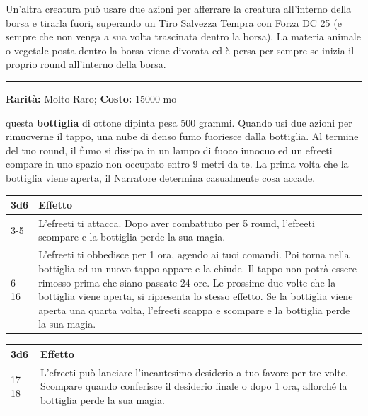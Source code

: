 \begin{multicols}{2}
Un'altra creatura può usare due azioni per afferrare la creatura all'interno della borsa e tirarla fuori, superando un Tiro Salvezza Tempra con Forza DC 25 (e sempre che non venga a sua volta trascinata dentro la borsa). La materia animale o vegetale posta dentro la borsa viene divorata ed è persa per sempre se inizia il proprio round all'interno della borsa.

\smallskip\noindent\rule{\linewidth}{2pt}  \hypertarget{Bottigliadell'Efreeti}{}\medskip{}\noindent\label{Bottigliadell'Efreeti}

\textbf{Rarità:} Molto Raro; \textbf{Costo:} 15000 mo

questa \textbf{bottiglia} di ottone dipinta pesa 500 grammi. Quando usi due azioni per rimuoverne il tappo, una nube di denso fumo fuoriesce dalla bottiglia. Al termine del tuo round, il fumo si dissipa in un lampo di fuoco innocuo ed un efreeti compare in uno spazio non occupato entro 9 metri da te. La prima volta che la bottiglia viene aperta, il Narratore determina casualmente cosa accade.

\medskip

\begin{tabularx}{0.45\textwidth}{lX}
\textbf{3d6} &\textbf{Effetto}\\
\hline
3-5 & L'efreeti ti attacca. Dopo aver combattuto per 5 round, l'efreeti scompare e la bottiglia perde la sua magia.\\
6-16 &L'efreeti ti obbedisce per 1 ora, agendo ai tuoi comandi. Poi torna nella bottiglia ed un nuovo tappo appare e la chiude. Il tappo non potrà essere rimosso prima che siano passate 24 ore. Le prossime due volte che la bottiglia viene aperta, si ripresenta lo stesso effetto. Se la bottiglia viene aperta una quarta volta, l'efreeti scappa e scompare e la bottiglia perde la sua magia.\\
\end{tabularx}
\begin{tabularx}{0.45\textwidth}{lX}
\textbf{3d6} &\textbf{Effetto}\\
\hline
17-18 & L'efreeti può lanciare l'incantesimo desiderio a tuo favore per tre volte. Scompare quando conferisce il desiderio finale o dopo 1 ora, allorché la bottiglia perde la sua magia.
\end{tabularx}



\end{multicols}
